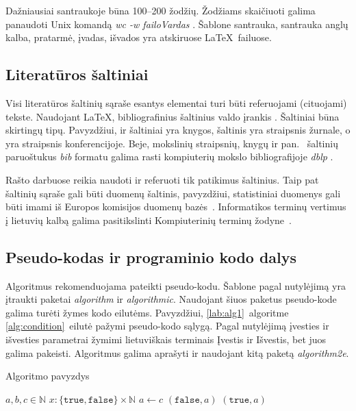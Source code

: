 \documentclass[a4paper,12pt]{article}
\begin{document}
Dažniausiai santraukoje būna 100--200 žodžių. Žodžiams skaičiuoti
galima panaudoti Unix komandą \emph{wc -w failoVardas} \cite{LinuxCom}.
Šablone santrauka, santrauka anglų kalba, pratarmė, įvadas, išvados
yra atskiruose \LaTeX\ failuose.


\subsection{Literatūros šaltiniai}
Visi literatūros šaltinių sąraše esantys elementai turi būti
referuojami (cituojami) tekste. Naudojant \LaTeX , bibliografinius
šaltinius valdo įrankis \BibTeX. Šaltiniai būna skirtingų
tipų. Pavyzdžiui, \cite{Cormen} ir \cite{Spatial} šaltiniai yra
knygos, \cite{SSJ14} šaltinis yra straipsnis žurnale, o \cite{SJK03}
yra straipsnis konferencijoje. Beje, mokslinių straipsnių, knygų ir
pan. \BibTeX ~šaltinių paruoštukus \emph{bib} formatu galima rasti
kompiuterių mokslo bibliografijoje \emph{dblp} \cite{dblp}.

Rašto darbuose reikia naudoti ir referuoti tik patikimus
šaltinius. Taip pat šaltinių sąraše gali būti duomenų šaltinis,
pavyzdžiui, statistiniai duomenys gali būti imami iš Europos komisijos
duomenų bazės~\cite{Eurostat}. Informatikos terminų vertimus į
lietuvių kalbą galima pasitikslinti Kompiuterinių terminų
žodyne~\cite{KTZ}.

\subsection{Pseudo-kodas ir programinio kodo dalys}

Algoritmus rekomenduojama pateikti pseudo-kodu. Šablone pagal
nutylėjimą yra įtraukti paketai \emph{algorithm} ir
\emph{algorithmic}. Naudojant šiuos paketus pseudo-kode galima turėti
žymes kodo eilutėms. Pavyzdžiui, \ref{lab:alg1}~algoritme
\ref{alg:condition}~eilutė pažymi pseudo-kodo sąlygą. Pagal nutylėjimą
įvesties ir išvesties parametrai žymimi lietuviškais terminais Įvestis
ir Išvestis, bet juos galima pakeisti. Algoritmus galima aprašyti ir
naudojant kitą paketą \emph{algorithm2e}.

\begin{algorithm}
\caption{Algoritmo pavyzdys}
\label{lab:alg1}
\begin{algorithmic}[1]
\REQUIRE $a,b,c\in \mathbb{N}$
\ENSURE $x:\{\mathtt{true,false}\}\times\mathbb{N} $
\label{alg:condition}
\STATE $a \leftarrow c$
\RETURN $(\mathtt{false},a)$
\ENDIF
\RETURN $(\mathtt{true},a)$
\end{algorithmic}
\end{algorithm}
\end{document}
